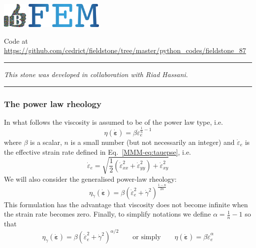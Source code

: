 \includegraphics[height=1.25cm]{images/pictograms/benchmark}
\includegraphics[height=1.25cm]{images/pictograms/FEM}




\begin{center}
Code at \url{https://github.com/cedrict/fieldstone/tree/master/python_codes/fieldstone_87}
\end{center}

\par\noindent\rule{\textwidth}{0.4pt}

{\sl This stone was developed in collaboration with Riad Hassani}. 

\par\noindent\rule{\textwidth}{0.4pt}

\subsubsection*{The power law rheology}

In what follows the viscosity 
is assumed to be of the power law type, i.e.
\[
\eta(\dot{\bm \varepsilon}) = \beta  \dot{\varepsilon}_e^{\frac1n-1}
\]
where $\beta$ is a scalar, $n$ is a small number (but not 
necessarily an integer) and
$\dot{\varepsilon}_e$ is the effective strain rate defined in Eq.~\eqref{MMM-eq:tauepse},
i.e.
\[
\dot\varepsilon_e = \sqrt{ \frac{1}{2}(\dot\varepsilon_{xx}^2 + \dot\varepsilon_{yy}^2 ) 
+ \dot\varepsilon_{xy}^2}
\]
We will also consider the generalised power-law rheology:
\[
\eta_{\dot\gamma}(\dot{\bm \varepsilon})  = \beta  ( \dot{\varepsilon}_e^2 + \dot\gamma^2)^{\frac{1-n}{2n}}
\]
This formulation has the advantage that viscosity does not become infinite 
when the strain rate becomes zero.
Finally, to simplify notations we define $\alpha=\frac1n-1$ so that 
\[
\boxed{
\eta_{\dot\gamma}(\dot{\bm \varepsilon})  = \beta  ( \dot{\varepsilon}_e^2 + \dot\gamma^2)^{\alpha/2}
}
\qquad
\text{or simply}
\qquad
\boxed{
\eta(\dot{\bm \varepsilon})  = \beta  \dot{\varepsilon}_e^\alpha
}
\]

